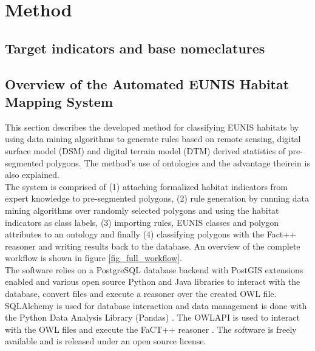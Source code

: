 \documentclass[authoryear, review,12pt,number]{elsarticle}
\begin{document}
 \section{Method} \subsection{Target indicators
and base nomeclatures} \label{subsec_indicators_and_nomenclatures}
\subsection{Overview of the Automated EUNIS Habitat Mapping System}
This section describes the developed method for classifying EUNIS habitats by
using data mining algorithms to generate rules based on remote sensing, digital
surface model (DSM) and digital terrain model (DTM) derived statistics of
pre-segmented polygons. The method's use of ontologies and the advantage
theirein is also explained.\\
The system is comprised of (1) attaching
formalized habitat indicators from expert knowledge to pre-segmented polygons,
(2) rule generation by running data mining algorithms over randomly selected
polygons and using the habitat indicators as class labels, (3) importing rules,
EUNIS classes and polygon attributes to an ontology and finally (4) classifying
polygons with the Fact++ reasoner \citep{Tsarkov2006} and writing results back
to the database. An overview of the complete workflow is shown in figure
\ref{fig_full_workflow}.\\
The software relies on a PostgreSQL database backend with PostGIS extensions
enabled and various open source Python and Java libraries to interact with the
database, convert files and execute a reasoner over the created OWL file.
SQLAlchemy is used for database interaction and data management is done with
the Python Data Analysis Library (Pandas) \citep{McKinney2010}. The OWLAPI is
used to interact with the OWL files and execute the FaCT++ reasoner
\citep{Tsarkov2006}. The software is freely available and is released under an
open source license.  
\end{document}
